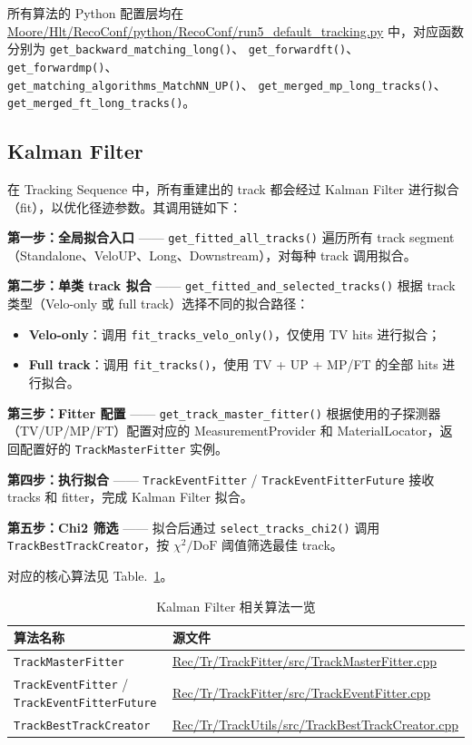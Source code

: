 \documentclass[UTF8]{article}
\begin{document}
所有算法的 Python 配置层均在 \url{Moore/Hlt/RecoConf/python/RecoConf/run5_default_tracking.py} 中，对应函数分别为 \lstinline{get_backward_matching_long()}、 \lstinline{get_forwardft()}、 \lstinline{get_forwardmp()}、 \\ \lstinline{get_matching_algorithms_MatchNN_UP()}、 \lstinline{get_merged_mp_long_tracks()}、 \lstinline{get_merged_ft_long_tracks()}。



\subsection{Kalman Filter}

在 Tracking Sequence 中，所有重建出的 track 都会经过 Kalman Filter 进行拟合（fit），以优化径迹参数。其调用链如下：

\textbf{第一步：全局拟合入口} —— \lstinline{get_fitted_all_tracks()} 遍历所有 track segment（Standalone、VeloUP、Long、Downstream），对每种 track 调用拟合。

\textbf{第二步：单类 track 拟合} —— \lstinline{get_fitted_and_selected_tracks()} 根据 track 类型（Velo-only 或 full track）选择不同的拟合路径：
\begin{itemize}
  \item \textbf{Velo-only}：调用 \lstinline{fit_tracks_velo_only()}，仅使用 TV hits 进行拟合；
  \item \textbf{Full track}：调用 \lstinline{fit_tracks()}，使用 TV + UP + MP/FT 的全部 hits 进行拟合。
\end{itemize}

\textbf{第三步：Fitter 配置} —— \lstinline{get_track_master_fitter()} 根据使用的子探测器（TV/UP/MP/FT）配置对应的 MeasurementProvider 和 MaterialLocator，返回配置好的 \texttt{TrackMasterFitter} 实例。

\textbf{第四步：执行拟合} —— \texttt{TrackEventFitter} / \texttt{TrackEventFitterFuture} 接收 tracks 和 fitter，完成 Kalman Filter 拟合。

\textbf{第五步：Chi2 筛选} —— 拟合后通过 \lstinline{select_tracks_chi2()} 调用 \texttt{TrackBestTrackCreator}，按 $\chi^2/\mathrm{DoF}$ 阈值筛选最佳 track。

对应的核心算法见 Table.~\ref{tab:kf-algos}。

\begin{table}[htbp]
  \centering
  \caption{Kalman Filter 相关算法一览}
  \label{tab:kf-algos}
  \begin{tabular}{ll}
    \toprule
    算法名称 & 源文件 \\
    \midrule
    \texttt{TrackMasterFitter} & \url{Rec/Tr/TrackFitter/src/TrackMasterFitter.cpp} \\
    \texttt{TrackEventFitter} / \texttt{TrackEventFitterFuture} & \url{Rec/Tr/TrackFitter/src/TrackEventFitter.cpp} \\
    \texttt{TrackBestTrackCreator} & \url{Rec/Tr/TrackUtils/src/TrackBestTrackCreator.cpp} \\
    \bottomrule
  \end{tabular}
\end{table}
\end{document}
